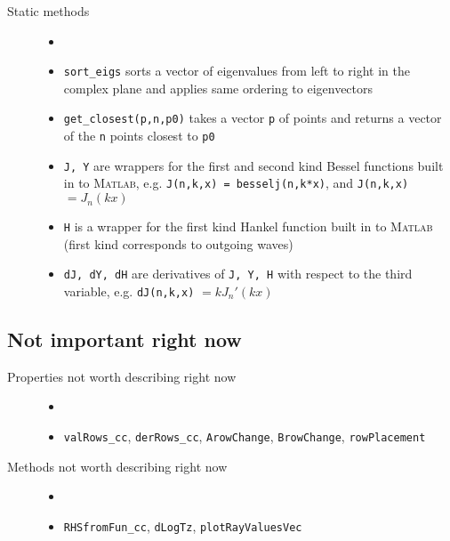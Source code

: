 \begin{description}
 \item[Static methods]
   \begin{itemize}
    \item[] %
    \item {\tt sort\_eigs} sorts a vector of eigenvalues from 
          left to right in the complex plane and applies same
          ordering to eigenvectors
    \item {\tt get\_closest(p,n,p0)} takes a vector {\tt p} of
          points and returns a vector of the {\tt n} points
          closest to {\tt p0}
    \item {\tt J, Y} are wrappers for the first and second kind
          Bessel functions built in to \textsc{Matlab}, e.g.
          {\tt J(n,k,x) = besselj(n,k*x)}, and 
          {\tt J(n,k,x)} $= J_n(kx)$
    \item {\tt H} is a wrapper for the first kind Hankel function
          built in to \textsc{Matlab} (first kind corresponds to
          outgoing waves)
    \item {\tt dJ, dY, dH} are derivatives of {\tt J, Y, H} 
          with respect to the third variable, e.g.
          {\tt dJ(n,k,x)} $= k J_n'(kx)$
   \end{itemize}
\end{description}

\subsection{Not important right now}
\label{sec-scattResComp2d-unimportant}

\begin{description}
 \item[Properties not worth describing right now]
   \begin{itemize}
    \item[] %
    \item {\tt valRows\_cc}, {\tt derRows\_cc}, 
          {\tt ArowChange}, {\tt BrowChange}, 
          {\tt rowPlacement}
   \end{itemize}

 \item[Methods not worth describing right now]
   \begin{itemize}
    \item[] %
    \item {\tt RHSfromFun\_cc}, {\tt dLogTz},
          {\tt plotRayValuesVec}
   \end{itemize}
\end{description}
